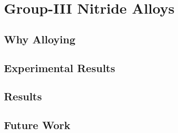 \section{Group-III Nitride Alloys}\label{group-iii-nitride-alloys}

\subsection{Why Alloying}\label{why-alloying}

\subsection{Experimental Results}\label{experimental-results}

\subsection{Results}\label{results}

\subsection{Future Work}\label{future-work}
